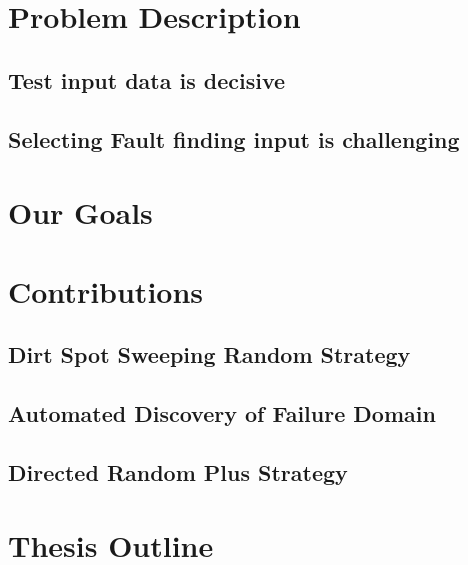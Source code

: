 \section{Problem Description}
\subsection{Test input data is decisive}
\subsection{Selecting Fault finding input is challenging}

\section{Our Goals}

\section{Contributions}
\subsection{Dirt Spot Sweeping Random Strategy}
\subsection{Automated Discovery of Failure Domain}
\subsection{Directed Random Plus Strategy}

\section{Thesis Outline}